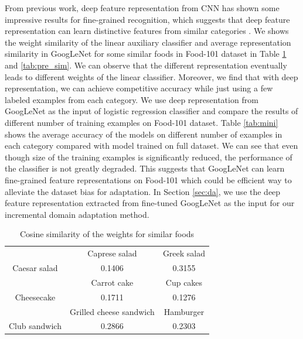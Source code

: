 From previous work, deep feature representation from CNN has shown some impressive results for fine-grained recognition, which suggests that deep feature representation can learn distinctive features from similar categories \cite{zhang2014part} \cite{razavian2014cnn}. We shows the weight similarity of the linear auxiliary classifier and average representation similarity in GoogLeNet for some similar foods in Food-101 dataset in Table \ref{tab:weight_sim} and \ref{tab:pre_sim}. We can observe that the different representation eventually leads to different weights of the linear classifier.
Moreover, we find that with deep representation, we can achieve competitive accuracy while just using a few labeled examples from each category.
We use deep representation from GoogLeNet as the input of logistic regression classifier and compare the results of different number of training examples on Food-101 dataset.
Table \ref{tab:mini} shows the average accuracy of the models on different number of examples in each category compared with model trained on full dataset. We can see that even though size of the training examples is significantly reduced, the performance of the classifier is not greatly degraded.
This suggests that GoogLeNet can learn fine-grained feature representations on Food-101 which could be efficient way to alleviate the dataset bias for adaptation. In Section \ref{sec:da}, we use the deep feature representation extracted from fine-tuned GoogLeNet as the input for our incremental domain adaptation method.
\begin{table}[htbp]
  \centering
  \caption{Cosine similarity of the weights for similar foods}
    \begin{tabular}{c|c|c}
    \toprule
          & Caprese salad & Greek salad \\
    Caesar salad & 0.1406 & 0.3155 \\
    \toprule
          & Carrot cake & Cup cakes \\
    Cheesecake & 0.1711 & 0.1276 \\
    \toprule
          & Grilled cheese sandwich & Hamburger \\
    Club sandwich & 0.2866 & 0.2303 \\
    \bottomrule
    \end{tabular}%
  \label{tab:weight_sim}%
\end{table}%
